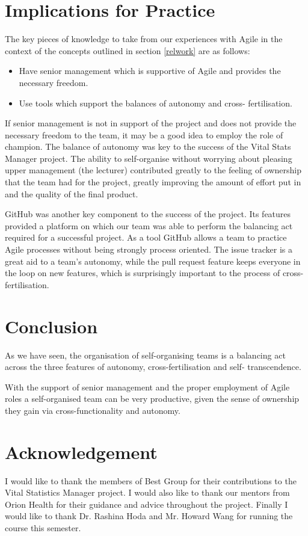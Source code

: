 \documentclass[conference]{IEEEtran}
\begin{document}
\section{Implications for Practice}

The key pieces of knowledge to take from our experiences with Agile in the
context of the concepts outlined in section \ref{relwork} are as follows:

\begin{itemize}

  \item Have senior management which is supportive of Agile and provides the
necessary freedom.

  \item Use tools which support the balances of autonomy and cross-
fertilisation.

\end{itemize}

If senior management is not in support of the project and does not provide the
necessary freedom to the team, it may be a good idea to employ the role of
champion. The balance of autonomy was key to the success of the Vital Stats
Manager project. The ability to self-organise without worrying about pleasing
upper management (the lecturer) contributed greatly to the feeling of ownership
that the team had for the project, greatly improving the amount of effort put in
and the quality of the final product.

GitHub was another key component to the success of the project. Its features
provided a platform on which our team was able to perform the balancing act
required for a successful project. As a tool GitHub allows a team to practice
Agile processes without being strongly process oriented. The issue tracker is a
great aid to a team's autonomy, while the pull request feature keeps everyone in
the loop on new features, which is surprisingly important to the process of
cross-fertilisation.

\section{Conclusion}

As we have seen, the organisation of self-organising teams is a balancing act
across the three features of autonomy, cross-fertilisation and self-
transcendence.

With the support of senior management and the proper employment of Agile roles
a self-organised team can be very productive, given the sense of ownership they
gain via cross-functionality and autonomy.


\section*{Acknowledgement}

I would like to thank the members of Best Group for their contributions to the
Vital Statistics Manager project. I would also like to thank our mentors from
Orion Health for their guidance and advice throughout the project. Finally I
would like to thank Dr. Rashina Hoda and Mr. Howard Wang for running the course
this semester.




\end{document}
